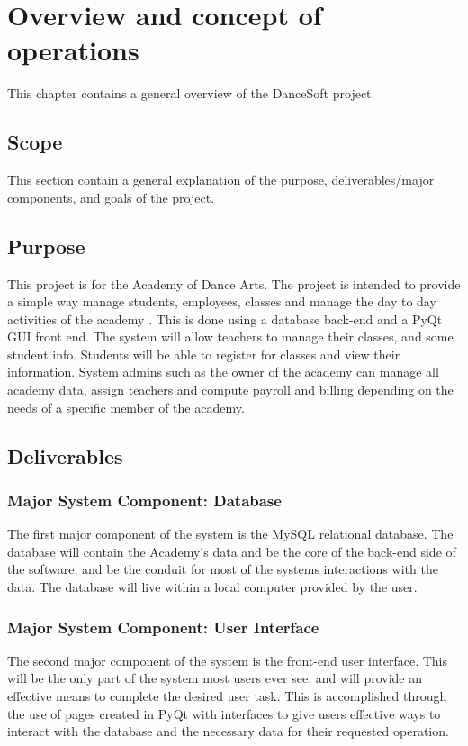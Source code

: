 
\chapter{Overview and concept of operations}

This chapter contains a  general overview of the DanceSoft project.


\section{Scope}
This section contain a general explanation of the purpose, deliverables/major components, and goals of the project.


\section{Purpose}
This project is for the Academy of Dance Arts. The project is intended to provide a simple way manage students, employees, classes and manage the day to day activities of the academy . This is done using a database back-end and a PyQt GUI front end. The system will allow teachers to manage their classes, and some student info. Students will be able to register for classes and view their information. System admins such as the owner of the academy can manage all academy data, assign teachers and compute payroll and billing depending on the needs of a specific member of the academy.  

\section{Deliverables} 

\subsection{Major System Component: Database}
The first major component of the system is the MySQL relational database. The database will contain the Academy's data and be the core of the back-end side of the software, and be the conduit for most of the systems interactions with the data. The database will live within a local computer provided by the user.  

\subsection{Major System Component: User Interface}
The second major component of the system is the front-end user interface. This will be the only part of the system most users ever see, and will provide an effective means to complete the desired user task. This is accomplished through the use of pages created in PyQt with interfaces to give users effective ways to interact with the database and the necessary data for their requested operation.

